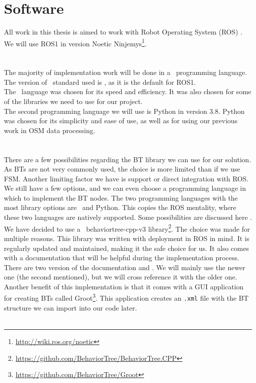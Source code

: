 \section{Software}
    All work in this thesis is aimed to work with Robot Operating System (ROS) \cite{ROS}. We will use ROS1 in version Noetic Ninjemys\footnote{\url{http://wiki.ros.org/noetic}}.\\\\
    \\
        The majority of implementation work will be done in a \CC\ programming language. The version of \CC\ standard used is , as it is the default for ROS1.\\
        The \CC\ language was chosen for its speed and efficiency. It was also chosen for some of the libraries we need to use for our project.\\
        The second programming language we will use is Python in version 3.8. Python was chosen for its simplicity and ease of use, as well as for using our previous work in OSM data processing.\\\\
    \\
        There are a few possibilities regarding the BT library we can use for our solution. As BTs are not very commonly used, the choice is more limited than if we use FSM. Another limiting factor we have is support or direct integration with ROS.\\
        We still have a few options, and we can even choose a programming language in which to implement the BT nodes. The two programming languages with the most library options are \CC\ and Python. This copies the ROS mentality, where these two languages are natively supported. Some possibilities are discussed here \cite{BT_FSM}.\\
        We have decided to use a \CC\ behaviortree-cpp-v3 library\footnote{\url{https://github.com/BehaviorTree/BehaviorTree.CPP}}. The choice was made for multiple reasons. This library was written with deployment in ROS in mind. It is regularly updated and maintained, making it the safe choice for us. It also comes with a documentation that will be helpful during the implementation process. There are two version of the documentation \cite{BT_docs} and \cite{BT_docs_new}. We will mainly use the newer one (the second mentioned), but we will cross reference it with the older one.\\
        Another benefit of this implementation is that it comes with a GUI application for creating BTs called Groot\footnote{\url{https://github.com/BehaviorTree/Groot}}. This application creates an \texttt{.xml} file with the BT structure we can import into our code later.\\\\
